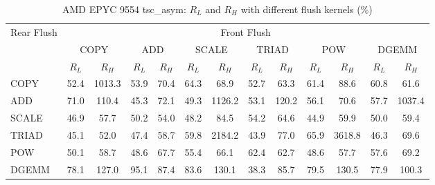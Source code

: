 \begin{table}[htbp]
\centering
\caption{AMD EPYC 9554 tsc\_asym: $R_L$ and $R_H$ with different flush kernels (\%)}
\label{tab:frkern-camd9554n2-tsc_asym}
\begin{tabular*}{\textwidth}{@{\extracolsep{\fill}}lcccccccccccc}
\toprule
\multirow{3}{*}{Rear Flush} & \multicolumn{12}{c}{Front Flush} \\ \cmidrule(lr){2-13}
& \multicolumn{2}{c}{COPY} & \multicolumn{2}{c}{ADD} & \multicolumn{2}{c}{SCALE} & \multicolumn{2}{c}{TRIAD} & \multicolumn{2}{c}{POW} & \multicolumn{2}{c}{DGEMM} \\ \cmidrule(lr){2-3} \cmidrule(lr){4-5} \cmidrule(lr){6-7} \cmidrule(lr){8-9} \cmidrule(lr){10-11} \cmidrule(lr){12-13}
& $R_L$ & $R_H$ & $R_L$ & $R_H$ & $R_L$ & $R_H$ & $R_L$ & $R_H$ & $R_L$ & $R_H$ & $R_L$ & $R_H$ \\ \midrule
COPY & 52.4 & 1013.3 & 53.9 & 70.4 & 64.3 & 68.9 & 52.7 & 63.3 & 61.4 & 88.6 & 60.8 & 61.6 \\
ADD & 71.0 & 110.4 & 45.3 & 72.1 & 49.3 & 1126.2 & 53.1 & 120.2 & 56.1 & 70.6 & 57.7 & 1037.4 \\
SCALE & 46.9 & 57.7 & 50.2 & 54.0 & 48.2 & 84.5 & 54.2 & 64.6 & 44.9 & 59.9 & 50.0 & 59.4 \\
TRIAD & 45.1 & 52.0 & 47.4 & 58.7 & 59.8 & 2184.2 & 43.9 & 77.0 & 65.9 & 3618.8 & 46.3 & 69.6 \\
POW & 50.1 & 58.7 & 48.6 & 67.7 & 55.4 & 66.1 & 62.4 & 62.7 & 48.6 & 57.7 & 57.6 & 69.2 \\
DGEMM & 78.1 & 127.0 & 95.1 & 87.4 & 83.6 & 130.1 & 38.3 & 85.7 & 79.5 & 130.5 & 77.9 & 100.3 \\
\bottomrule
\end{tabular*}
\end{table}